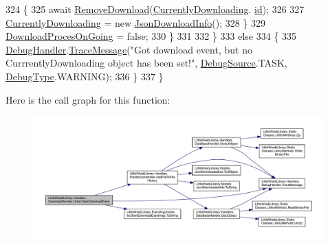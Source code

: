 \begin{DoxyCode}
324                     \{
325                         await \mbox{\hyperlink{class_little_weeb_library_1_1_handlers_1_1_download_handler_aac22841386d098daef366cbe05262187}{RemoveDownload}}(\mbox{\hyperlink{class_little_weeb_library_1_1_handlers_1_1_download_handler_a45f8f3fe581060feacfedcaee99d9363}{CurrentlyDownloading}}.
      \mbox{\hyperlink{class_little_weeb_library_1_1_models_1_1_json_download_info_ae74efeee78e915f2fff1eb34bfd125f5}{id}});
326 
327                         \mbox{\hyperlink{class_little_weeb_library_1_1_handlers_1_1_download_handler_a45f8f3fe581060feacfedcaee99d9363}{CurrentlyDownloading}} = \textcolor{keyword}{new} 
      \mbox{\hyperlink{class_little_weeb_library_1_1_models_1_1_json_download_info}{JsonDownloadInfo}}();
328                     \}
329                     \mbox{\hyperlink{class_little_weeb_library_1_1_handlers_1_1_download_handler_a2819c4cad3fca5a4b6ebc9894e3788fc}{DownloadProcesOnGoing}} = \textcolor{keyword}{false};
330                 \}
331 
332             \}
333             \textcolor{keywordflow}{else}
334             \{
335                 \mbox{\hyperlink{class_little_weeb_library_1_1_handlers_1_1_download_handler_a9f1aedadbd6f343d8de1c54724eca11e}{DebugHandler}}.\mbox{\hyperlink{interface_little_weeb_library_1_1_handlers_1_1_i_debug_handler_a2e405bc3492e683cd3702fae125221bc}{TraceMessage}}(\textcolor{stringliteral}{"Got download event, but no
       CurrrentlyDownloading object has been set!"}, \mbox{\hyperlink{namespace_little_weeb_library_1_1_handlers_a2a6ca0775121c9c503d58aa254d292be}{DebugSource}}.TASK, \mbox{\hyperlink{namespace_little_weeb_library_1_1_handlers_ab66019ed40462876ec4e61bb3ccb0a62}{DebugType}}.WARNING);
336             \}
337         \}
\end{DoxyCode}
Here is the call graph for this function\+:\nopagebreak
\begin{figure}[H]
\begin{center}
\leavevmode
\includegraphics[width=350pt]{class_little_weeb_library_1_1_handlers_1_1_download_handler_a8e40df55d254c0b95bb0a72becde5039_cgraph}
\end{center}
\end{figure}
\mbox{\label{class_little_weeb_library_1_1_handlers_1_1_download_handler_a2f646f8d28235a8953b67207ee6131d9}} 
